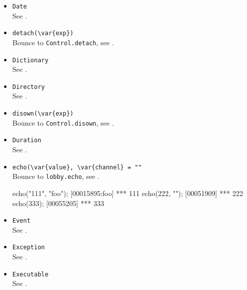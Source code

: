 \begin{itemize}
\item \lstinline|Date|\\
  See .

\item \lstinline|detach(\var{exp})|\\
  Bounce to \lstinline|Control.detach|, see .

\item \lstinline|Dictionary|\\
  See .

\item \lstinline|Directory|\\
  See .

\item \lstinline|disown(\var{exp})|\\
  Bounce to \lstinline|Control.disown|, see .

\item \lstinline|Duration|\\
  See .

\item \lstinline|echo(\var{value}, \var{channel} = ""|\\
  Bounce to \lstinline|lobby.echo|, see .
\begin{urbiscript}[firstnumber=last]
echo("111", "foo");
[00015895:foo] *** 111
echo(222, "");
[00051909] *** 222
echo(333);
[00055205] *** 333
\end{urbiscript}

\item \lstinline|Event|\\
  See .

\item \lstinline|Exception|\\
  See .

\item \lstinline|Executable|\\
  See .


\end{itemize}
